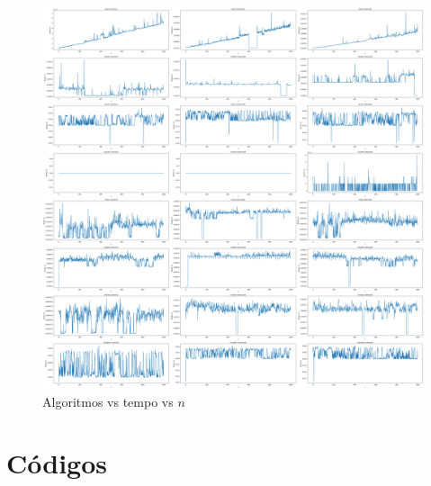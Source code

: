 \begin{figure}[h!]
	\centering
	\includegraphics[width=1\linewidth]{imgs/tempo}
	\caption{Algoritmos vs tempo vs $n$}
	\label{fig:tempo}
\end{figure}

\section{Códigos}





